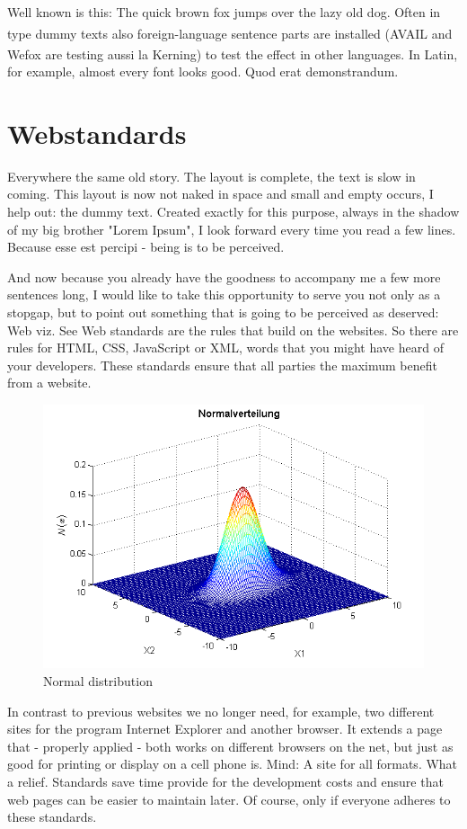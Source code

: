 Well known is this: The quick brown fox jumps over the lazy old dog. Often in type dummy texts also foreign-language sentence parts are installed (AVAIL\textsuperscript{\texttrademark} and Wefox\textsuperscript{\textregistered} are testing aussi la Kerning) to test the effect in other languages. In Latin, for example, almost every font looks good. Quod erat demonstrandum.

\section{Webstandards}
\label{sec:satzspiegeltest_webstandards}

Everywhere the same old story. The layout is complete, the text is slow in coming. This layout is now not naked in space and small and empty occurs, I help out: the dummy text. Created exactly for this purpose, always in the shadow of my big brother "Lorem Ipsum", I look forward every time you read a few lines. Because esse est percipi - being is to be perceived.

And now because you already have the goodness to accompany me a few more sentences long, I would like to take this opportunity to serve you not only as a stopgap, but to point out something that is going to be perceived as deserved: Web viz. See Web standards are the rules that build on the websites. So there are rules for HTML, CSS, JavaScript or XML, words that you might have heard of your developers. These standards ensure that all parties the maximum benefit from a website.

\begin{figure}[H]
	\centering
		\includegraphics[scale=0.7]{images/multivariate_gauss.png}
	\caption{Normal distribution}
	\label{fig:normal_distribution}
\end{figure}

In contrast to previous websites we no longer need, for example, two different sites for the program Internet Explorer and another browser. It extends a page that - properly applied - both works on different browsers on the net, but just as good for printing or display on a cell phone is. Mind: A site for all formats. What a relief. Standards save time provide for the development costs and ensure that web pages can be easier to maintain later. Of course, only if everyone adheres to these standards.
